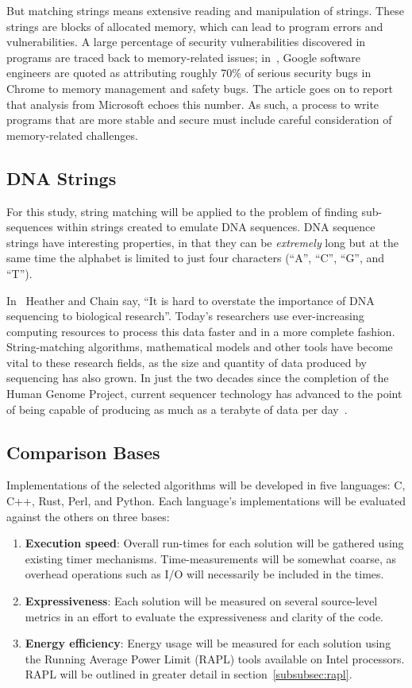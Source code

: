 But matching strings means extensive reading and manipulation of strings. These strings are blocks of allocated memory, which can lead to program errors and vulnerabilities. A large percentage of security vulnerabilities discovered in programs are traced back to memory-related issues; in~\cite{cimpanu}, Google software engineers are quoted as attributing roughly 70\% of serious security bugs in Chrome to memory management and safety bugs. The article goes on to report that analysis from Microsoft echoes this number. As such, a process to write programs that are more stable and secure must include careful consideration of memory-related challenges.

\subsection{DNA Strings}

For this study, string matching will be applied to the problem of finding sub-sequences within strings created to emulate DNA sequences. DNA sequence strings have interesting properties, in that they can be \textit{extremely} long but at the same time the alphabet is limited to just four characters (``A'', ``C'', ``G'', and ``T'').

In~\cite{heather} Heather and Chain say, ``It is hard to overstate the importance of DNA sequencing to biological research''. Today's researchers use ever-increasing computing resources to process this data faster and in a more complete fashion. String-matching algorithms, mathematical models and other tools have become vital to these research fields, as the size and quantity of data produced by sequencing has also grown. In just the two decades since the completion of the Human Genome Project, current sequencer technology has advanced to the point of being capable of producing as much as a terabyte of data per day~\cite{cabral}.

\subsection{Comparison Bases}
\label{subsec:comparison}

Implementations of the selected algorithms will be developed in five languages: C, C++, Rust, Perl, and Python. Each language's implementations will be evaluated against the others on three bases:

\begin{enumerate}
\item \textbf{Execution speed}: Overall run-times for each solution will be gathered using existing timer mechanisms. Time-measurements will be somewhat coarse, as overhead operations such as I/O will necessarily be included in the times.
\item \textbf{Expressiveness}: Each solution will be measured on several source-level metrics in an effort to evaluate the expressiveness and clarity of the code.
\item \textbf{Energy efficiency}: Energy usage will be measured for each solution using the Running Average Power Limit (RAPL) tools available on Intel processors. RAPL will be outlined in greater detail in section~\ref{subsubsec:rapl}.
\end{enumerate}


